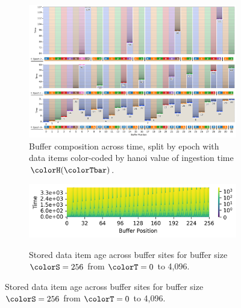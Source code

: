 \begin{figure}[htbp!]
\begin{subfigure}[b]{\linewidth}
\includegraphics[width=\linewidth]{
binder/teeplots/41/num-generations=128+surface-size=32+viz=site-reservation-by-rank-spliced-at-heatmap+ext=}
\vspace{-4.5ex}\caption{
  Buffer composition across time, split by epoch with data items color-coded by hanoi value of ingestion time $\colorH(\colorTbar)$.
}
\label{fig:hsurf-stretched-implementation-schematic}
\end{subfigure}

\vspace{0.5ex}
\begin{minipage}[]{\textwidth}
 \vspace{-2pt}
  \begin{subfigure}[t]{0.65\linewidth}
    \vspace{0pt}
    \centering
  \includegraphics[width=0.88\linewidth,clip]{binder/teeplots/41/cnorm=log+num-generations=4096+surface-size=256+viz=site-ingest-depth-by-rank-heatmap+ynorm=linear+ext=.png}  %
  \end{subfigure}%
  \begin{subfigure}[t]{0.35\linewidth}
  \vspace{-2pt}
  \caption{%
    \footnotesize
    Stored data item age across buffer sites for buffer size $\colorS=256$ from $\colorT=0$ to 4,096.
  }
  \label{fig:hsurf-stretched-implementation-heatmap}
\end{subfigure}
\end{minipage}


\end{figure}

